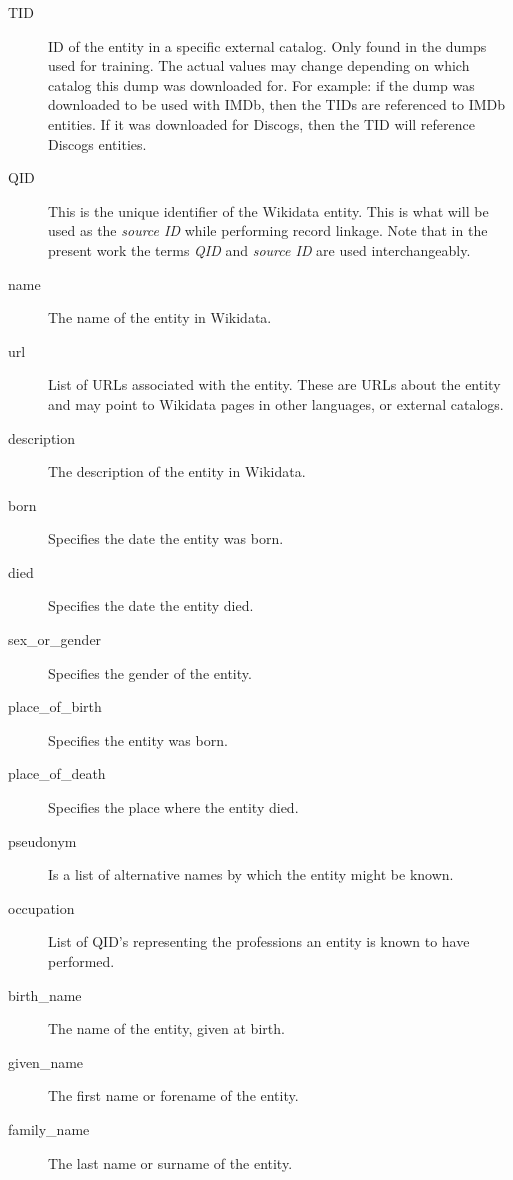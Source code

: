 \documentclass[epsfig,a4paper,11pt,titlepage,twoside,openany]{book}
\begin{document}
\begin{description}

\item[TID] ID of the entity in a specific external catalog. Only found in the dumps used for training. The actual values may change depending on which catalog this dump was downloaded for. For example: if the dump was downloaded to be used with IMDb, then the TIDs are referenced to IMDb entities. If it was downloaded for Discogs, then the TID will reference Discogs entities. 

\item[QID] This is the unique identifier of the Wikidata entity. This is what will be used as the \textit{source ID} while performing record linkage. Note that in the present work the terms \textit{QID} and \textit{source ID} are used interchangeably.

\item[name] The name of the entity in Wikidata.

\item[url] List of URLs associated with the entity. These are URLs about the entity and may point to Wikidata pages in other languages, or external catalogs.

\item[description] The description of the entity in Wikidata.

\item[born] Specifies the date the entity was born.

\item[died] Specifies the date the entity died.

\item[sex\_or\_gender] Specifies the gender of the entity.

\item[place\_of\_birth] Specifies the entity was born.

\item[place\_of\_death] Specifies the place where the entity died.

\item[pseudonym] Is a list of alternative names by which the entity might be known.

\item[occupation] List of QID's representing the professions an entity is known to have performed.

\item[birth\_name] The name of the entity, given at birth.

\item[given\_name] The first name or forename of the entity.

\item[family\_name] The last name or surname of the entity.
\end{description}
\end{document}
